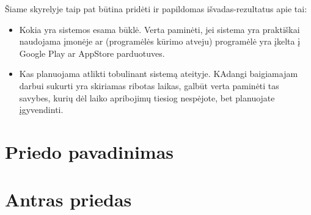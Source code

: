 \documentclass{ktuthesis}
\begin{document}
  Šiame skyrelyje taip pat būtina pridėti ir papildomas išvadas-rezultatus apie tai:
  \begin{itemize}[label={--}]
    \item Kokia yra sistemos esama būklė. Verta paminėti, jei sistema yra praktiškai naudojama įmonėje ar (programėlės kūrimo atveju) programėlė yra įkelta
    į Google Play ar AppStore parduotuves.
    \item Kas planuojama atlikti tobulinant sistemą ateityje. KAdangi baigiamajam darbui sukurti yra skiriamas ribotas laikas, galbūt verta paminėti tas savybes,
    kurių dėl laiko apribojimų tiesiog nespėjote, bet planuojate įgyvendinti.
  \end{itemize}

  \clearpage
  \printbibliography[title={\hfil\fontsize{12}{15}\selectfont{List of references}}]

  \newpage

  \appendix
  \renewcommand{\thesection}{\arabic{section}}

  \section{Priedo pavadinimas}

  \section{Antras priedas}
\end{document}
